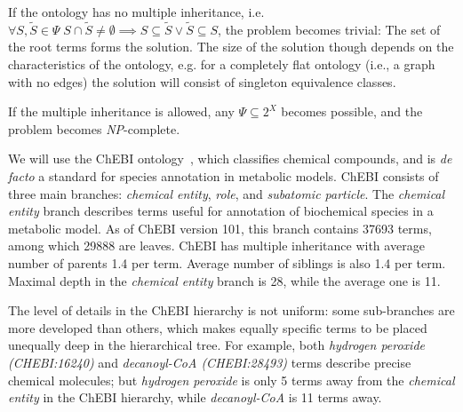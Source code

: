 \documentclass[10pt]{bmc_article}
\newenvironment{bmcformat}{\baselineskip20pt\sloppy\setboolean{publ}{false}}{\baselineskip20pt\sloppy}
\begin{document}
\begin{bmcformat}
If the ontology has no multiple inheritance, i.e. $\forall S, \tilde{S} \in \Psi \; S \cap \tilde{S} \neq \emptyset \implies S \subseteq \tilde{S} \lor \tilde{S} \subseteq S$, the problem becomes trivial: The set of the root terms forms the solution. The size of the solution though depends on the characteristics of the ontology, e.g. for a completely flat ontology (i.e., a graph with no edges) the solution will consist of singleton equivalence classes.

If the multiple inheritance is allowed, any $\Psi \subseteq 2^X$ becomes possible, and the problem becomes \textit{NP}-complete. 

We will use the ChEBI ontology~\cite{deMatos10}, which classifies chemical compounds, and is \textit{de facto} a standard for species annotation in metabolic models. ChEBI consists of three main branches: \textit{chemical entity}, \textit{role}, and \textit{subatomic particle}. The \textit{chemical entity} branch describes terms useful for annotation of biochemical species in a metabolic model. As of ChEBI version 101, this branch contains 37693 terms, among which 29888 are leaves. ChEBI has multiple inheritance with average number of parents 1.4 per term. Average number of siblings is also 1.4 per term. Maximal depth in the \textit{chemical entity} branch is 28, while the average one is 11.

The level of details in the ChEBI hierarchy is not uniform: some sub-branches are more developed than others, which makes equally specific terms to be placed unequally deep in the hierarchical tree. For example, both \textit{hydrogen peroxide (CHEBI:16240)} and \textit{decanoyl-CoA (CHEBI:28493)} terms describe precise chemical molecules; but \textit{hydrogen peroxide} is only 5 terms away from the \textit{chemical entity} in the ChEBI hierarchy, while \textit{decanoyl-CoA} is 11 terms away. 


\end{bmcformat}
\end{document}
